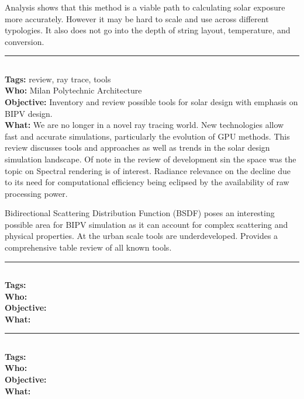 \documentclass[11pt,a4paper]{article}
\begin{document}
Analysis shows that this method is a viable path to calculating solar exposure more accurately. However it may be hard to scale and use across different typologies. It also does not go into the depth of string layout, temperature, and conversion.

\noindent\rule{\textwidth}{1pt}
\subsection*{}
\textbf{Tags:} review, ray trace, tools \\
\textbf{Who:} Milan Polytechnic Architecture \\
\textbf{Objective:} Inventory and review possible tools for solar design with emphasis on BIPV design. \\
\textbf{What:} We are no longer in a novel ray tracing world. New technologies allow fast and accurate simulations, particularly the evolution of GPU methods. This review discusses tools and approaches as well as trends in the solar design simulation landscape. Of note in the review of development sin the space was the topic on Spectral rendering is of interest. Radiance relevance on the decline due to its need for computational efficiency being eclipsed by the availability of raw processing power.

Bidirectional Scattering Distribution Function (BSDF) poses an interesting possible area for BIPV simulation as it can account for complex scattering and physical properties. At the urban scale tools are underdeveloped. Provides a comprehensive table review of all known tools.

\noindent\rule{\textwidth}{1pt}
\subsection*{\bibentry{}}
\textbf{Tags:}  \\
\textbf{Who:}  \\
\textbf{Objective:}  \\
\textbf{What:} 

\noindent\rule{\textwidth}{1pt}
\subsection*{\bibentry{}}
\textbf{Tags:}  \\
\textbf{Who:}  \\
\textbf{Objective:}  \\
\textbf{What:} 
\end{document}
